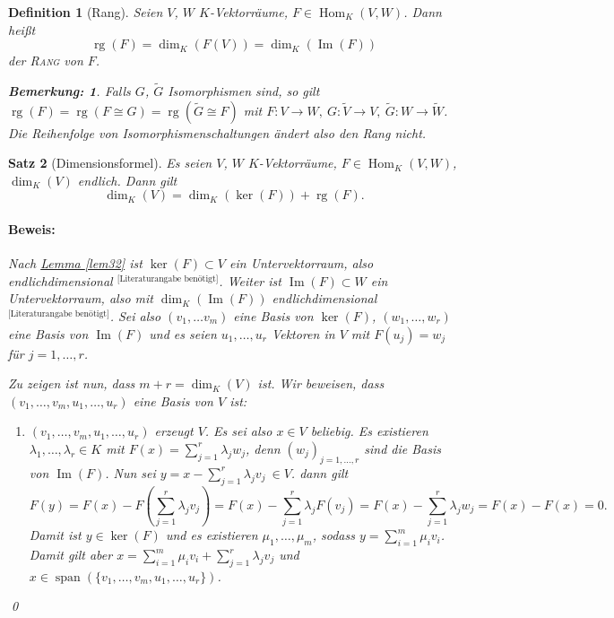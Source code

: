 \documentclass{report}
\newcommand{\IN}[1]{\index{#1|BH}}
\newcommand{\lb}{\lambda}
\DeclareMathOperator{\Span}{span}
\DeclareMathOperator{\Hom}{Hom}
\DeclareMathOperator{\Ima}{Im}
\DeclareMathOperator{\rg}{rg}
\theoremstyle{customrem}
\newtheorem*{bemerkung}{Bemerkung\textnormal:}
\theoremstyle{customdef}
\newtheorem{definition}{Definition}[chapter]
\newtheorem{satz}[definition]{Satz}
\renewenvironment{proof}{\paragraph{Beweis: }}{\qed}
\newcommand{\defemph}[1]{\textsc{#1}}
\begin{document}
	\begin{definition}[Rang]
		\IN{Rang}
		Seien \(V\), \(W\) \(K\)-Vektorräume, \(F\in\Hom_K(V, W)\). Dann heißt \[\rg(F)=\dim_K(F(V)) = \dim_K(\Ima(F))\] der \defemph{Rang} von \(F\).\\
		\begin{bemerkung}
			Falls \(G\), \(\widetilde{G}\) Isomorphismen sind, so gilt \(\rg(F) = \rg(F\cong G) = \rg(\widetilde{G}\cong F)\) mit \(F:V\to W,\ G:\widetilde{V}\to V,\ \widetilde{G}: W\to\widetilde{W}\). Die Reihenfolge von Isomorphismenschaltungen ändert also den Rang nicht.\\
		\end{bemerkung}
	\end{definition}
	
	\begin{satz}[Dimensionsformel]
		\IN{Dimensionsformel}
		\label{satz37}
		Es seien \(V\), \(W\) \(K\)-Vektorräume, \(F\in\Hom_K(V, W)\), \(\dim_K(V)\) endlich. Dann gilt \[\dim_K(V) = \dim_K(\ker(F))+\rg(F).\]
		\begin{proof}
			Nach \hyperref[lem32]{Lemma \ref*{lem32}} ist \(\ker(F)\subset V\) ein Untervektorraum, also endlichdimensional \({}^\text{[Literaturangabe benötigt]}\). Weiter ist \(\Ima(F)\subset W\) ein Untervektorraum, also mit \(\dim_K(\Ima(F))\) endlichdimensional \({}^\text{[Literaturangabe benötigt]}\). Sei also \((v_1, \ldots v_m)\) eine Basis von \(\ker(F)\), \((w_1,\ldots, w_r)\) eine Basis von \(\Ima(F)\) und es seien \(u_1,\ldots, u_r\) Vektoren in \(V\) mit \(F(u_j)=w_j\) für \(j=1, \ldots, r\).
			
			Zu zeigen ist nun, dass \(m+r=\dim_K(V)\) ist. Wir beweisen, dass \((v_1, \ldots, v_m, u_1, \ldots, u_r)\) eine Basis von \(V\) ist:
			\begin{enumerate}
				\item \((v_1, \ldots, v_m, u_1, \ldots, u_r)\) erzeugt \(V\). Es sei also \(x\in V\) beliebig. Es existieren \(\lb_1, \ldots, \lb_r\in K\) mit \(F(x) = \sum_{j=1}^{r}\lb_j w_j\), denn \((w_j)_{j=1, \ldots, r}\) sind die Basis von \(\Ima(F)\). Nun sei \(y=x-\sum_{j=1}^{r}\lb_j v_j\ \in V\). dann gilt \[F(y) = F(x) - F\left(\sum_{j=1}^{r}\lb_j v_j\right) = F(x) - \sum_{j=1}^{r}\lb_j F(v_j)= F(x) - \sum_{j=1}^{r}\lb_j w_j = F(x)-F(x)=0.\] Damit ist \(y\in \ker(F)\) und es existieren \(\mu_1, \ldots, \mu_m\), sodass \(y=\sum_{i=1}^{m}\mu_i v_i\). Damit gilt aber \(x=\sum_{i=1}^{m}\mu_iv_i + \sum_{j=1}^{r}\lb_jv_j\) und \(x\in \Span(\{v_1, \ldots, v_m, u_1, \ldots, u_r\})\). 
				

\end{enumerate}
\end{proof}
\end{satz}
\end{document}
